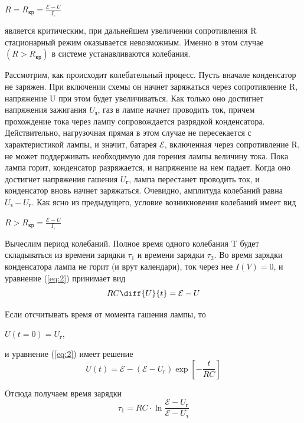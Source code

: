 \begin{center}
$R=R_{\text{кр}}=\frac{\mathcal{E}-U}{I_{\text{г}}}$
\end{center}

является критическим, при дальнейшем увеличении сопротивления R стационарный режим оказывается невозможным.
Именно в этом случае $(R>R_{\text{кр}})$ в системе устанавливаются колебания.


Рассмотрим, как происходит колебательный процесс. Пусть вначале конденсатор не заряжен. При включении схемы он начнет заряжаться через сопротивление R, напряжение U при этом будет увеличиваться. Как только оно достигнет напряжения зажигания $U_{\text{з}}$, газ в лампе начнет проводить ток, причем прохождение тока через лампу сопровождается разрядкой конденсатора. Действительно, нагрузочная прямая в этом случае не пересекается с характеристикой лампы, и значит, батарея $\mathcal{E}$, включенная через сопротивление R, не может поддерживать необходимую для горения лампы величину тока. Пока лампа горит, конденсатор разряжается, и напряжение на нем падает. Когда оно достигнет напряжения гашения $U_{\text{г}}$, лампа перестанет проводить ток, и конденсатор вновь начнет заряжаться. Очевидно, амплитуда колебаний равна $U_{\text{з}}-U_{\text{г}}$. Как ясно из предыдущего, условие возникновения колебаний имеет вид

\begin{center}
$R>R_{\text{кр}}=\frac{\mathcal{E}-U}{I_{\text{г}}}$
\end{center}
Вычеслим период колебаний. Полное время одного колебания T будет складываться из времени зарядки $\tau_1$ и времени зарядки $\tau_2$. Во время зарядки конденсатора лампа не горит (и врут календари), ток через нее $I(V)=0$, и уравнение (\ref{eq:2}) принимает вид
\begin{equation}
\label{eq:3}	
	RC\diff{U}{t}=\mathcal{E}-U
	\end{equation}

Если отсчитывать время от момента гашения лампы, то 
\begin{center}
$U(t=0)=U_{\text{г}}$,
	\end{center}

и уравнение (\ref{eq:2}) имеет решение
\begin{equation}
	U(t)= \mathcal{E}-(\mathcal{E}-U_{\text{г}}) \exp{\left[- \frac{t}{RC} \right] }
	\end{equation}

Отсюда получаем время зарядки
\begin{equation}
\label{tau:1}
	\tau_1=RC\cdot \ln \frac {\mathcal{E}-U_{\text{г}}} 	{\mathcal{E}-U_{\text{з}}}
	\end{equation}

